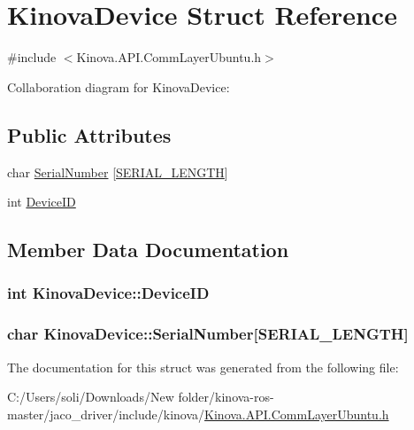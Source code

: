\hypertarget{struct_kinova_device}{}\section{Kinova\+Device Struct Reference}
\label{struct_kinova_device}


{\ttfamily \#include $<$Kinova.\+A\+P\+I.\+Comm\+Layer\+Ubuntu.\+h$>$}



Collaboration diagram for Kinova\+Device\+:
\subsection*{Public Attributes}
\begin{DoxyCompactItemize}
\item 
char \hyperlink{struct_kinova_device_ac30b34d321f4bd56ef42bfabc2cf6e65}{Serial\+Number} \mbox{[}\hyperlink{_kinova_8_a_p_i_8_comm_layer_ubuntu_8h_a2e19fae8619e7a3b28aecdcf5d7cd51d}{S\+E\+R\+I\+A\+L\+\_\+\+L\+E\+N\+G\+TH}\mbox{]}
\item 
int \hyperlink{struct_kinova_device_a8083dd1a66b42e373823fdb1a16b02e7}{Device\+ID}
\end{DoxyCompactItemize}


\subsection{Member Data Documentation}
\subsubsection[{\texorpdfstring{Device\+ID}{DeviceID}}]{\setlength{\rightskip}{0pt plus 5cm}int Kinova\+Device\+::\+Device\+ID}\hypertarget{struct_kinova_device_a8083dd1a66b42e373823fdb1a16b02e7}{}\label{struct_kinova_device_a8083dd1a66b42e373823fdb1a16b02e7}
\subsubsection[{\texorpdfstring{Serial\+Number}{SerialNumber}}]{\setlength{\rightskip}{0pt plus 5cm}char Kinova\+Device\+::\+Serial\+Number\mbox{[}{\bf S\+E\+R\+I\+A\+L\+\_\+\+L\+E\+N\+G\+TH}\mbox{]}}\hypertarget{struct_kinova_device_ac30b34d321f4bd56ef42bfabc2cf6e65}{}\label{struct_kinova_device_ac30b34d321f4bd56ef42bfabc2cf6e65}


The documentation for this struct was generated from the following file\+:\begin{DoxyCompactItemize}
\item 
C\+:/\+Users/soli/\+Downloads/\+New folder/kinova-\/ros-\/master/jaco\+\_\+driver/include/kinova/\hyperlink{_kinova_8_a_p_i_8_comm_layer_ubuntu_8h}{Kinova.\+A\+P\+I.\+Comm\+Layer\+Ubuntu.\+h}\end{DoxyCompactItemize}
